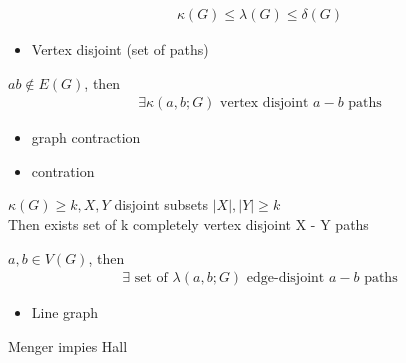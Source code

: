 \begin{fact}
    \begin{align*}
        \kappa(G) \leq \lambda(G) \leq \delta(G)
    \end{align*}
\end{fact}

\begin{itemize}
    \item Vertex disjoint (set of paths)
\end{itemize}

\begin{thm}[Menger] $ab \notin E(G)$, then
    \begin{align*}
         \text{$\exists \kappa(a, b; G) $ vertex disjoint $a - b$ paths}
    \end{align*}
\end{thm}

\begin{itemize}
    \item graph contraction
    \item contration
\end{itemize}

\begin{cor}
    $\kappa(G) \geq k, X, Y$ disjoint subsets $|X|, |Y| \geq k$ \\
    Then exists set of k completely vertex disjoint X - Y paths
\end{cor}

\begin{thm}
    $a, b \in V(G)$, then
    \begin{align*}
        \exists \text{ set of } \lambda(a, b; G) \text{ edge-disjoint } a - b \text{ paths}
    \end{align*}
\end{thm}

\begin{itemize}
    \item Line graph
\end{itemize}

\begin{fact}
    Menger impies Hall
\end{fact}
